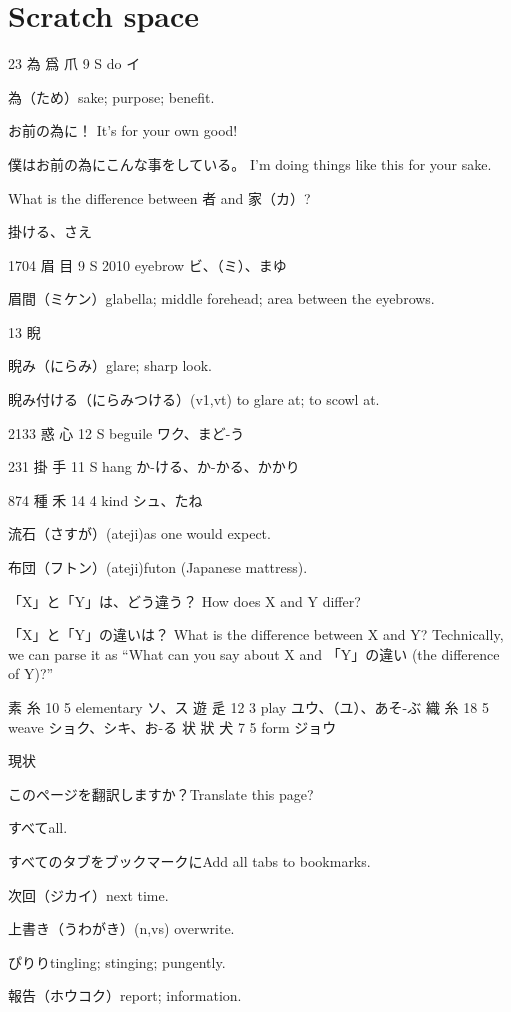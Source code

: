 \chapter{Scratch space}

23	為	爲	爪	9	S		do	イ

為（ため）sake; purpose; benefit.

お前の為に！
It's for your own good!

僕はお前の為にこんな事をしている。
I'm doing things like this for your sake.

What is the difference between 者 and 家（カ）?

掛ける、さえ

1704	眉		目	9	S	2010	eyebrow	ビ、（ミ）、まゆ

眉間（ミケン）glabella; middle forehead; area between the eyebrows.

13 睨

睨み（にらみ）glare; sharp look.

睨み付ける（にらみつける）(v1,vt) to glare at; to scowl at.

2133	惑		心	12	S		beguile	ワク、まど-う

231	掛		手	11	S		hang	か-ける、か-かる、かかり

874	種		禾	14	4		kind	シュ、たね

流石（さすが）(ateji)as one would expect.

布団（フトン）(ateji)futon (Japanese mattress).

「X」と「Y」は、どう違う？
How does X and Y differ?

「X」と「Y」の違いは？
What is the difference between X and Y?
Technically, we can parse it as
``What can you say about X and 「Y」の違い (the difference of Y)?''

素  糸 10 5  elementary ソ、ス
遊  辵 12 3  play ユウ、（ユ）、あそ-ぶ
織  糸 18 5  weave ショク、シキ、お-る
状 狀 犬 7 5  form ジョウ

現状

このページを翻訳しますか？Translate this page?

すべてall.

すべてのタブをブックマークにAdd all tabs to bookmarks.

次回（ジカイ）next time.

上書き（うわがき）(n,vs) overwrite.

ぴりりtingling; stinging; pungently.

報告（ホウコク）report; information.

